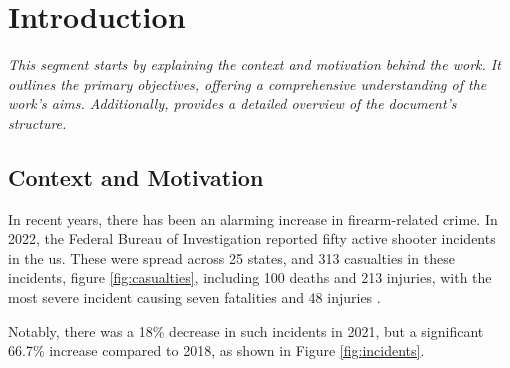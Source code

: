 \chapter{Introduction}
\label{chapter:introduction}

\newenvironment{introduction2}
{\quote\itshape}
{\endquote}

\begin{introduction2}
    This segment starts by explaining the context and motivation behind the work. It outlines the primary objectives, offering a comprehensive understanding of the work's aims. Additionally, provides a detailed overview of the document's structure.
\end{introduction2}

\section{Context and Motivation}
In recent years, there has been an alarming increase in firearm-related crime. In 2022, the Federal Bureau of 
Investigation reported fifty active shooter incidents in the \ac{us}. These were spread across 25 states, 
and 313 casualties in these incidents, 
figure \ref{fig:casualties}, including 100 deaths and 213 injuries, with the most severe incident causing seven 
fatalities and 48 injuries \cite{rfc37}.

Notably, there was a 18\% decrease in such incidents in 2021, but a significant 66.7\% increase compared to 2018, as shown in Figure \ref{fig:incidents}.

